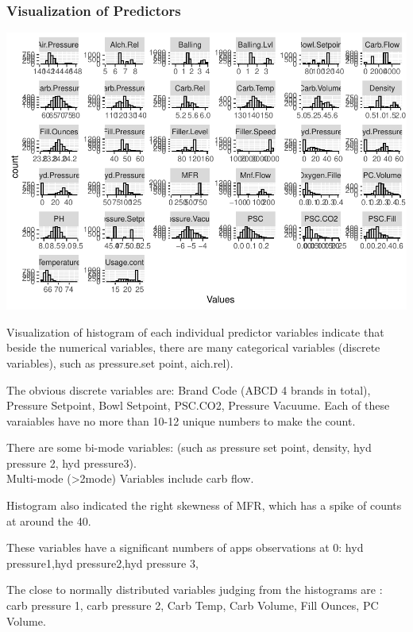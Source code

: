 \documentclass[]{article}
\begin{document}
\subsubsection{Visualization of
Predictors}\label{visualization-of-predictors}

\begin{center}\includegraphics{OmerOzeren_GracieHan_Project_2_files/figure-latex/unnamed-chunk-7-1} \end{center}

Visualization of histogram of each individual predictor variables
indicate that beside the numerical variables, there are many categorical
variables (discrete variables), such as pressure.set point, aich.rel).

The obvious discrete variables are: Brand Code (ABCD 4 brands in total),
Pressure Setpoint, Bowl Setpoint, PSC.CO2, Pressure Vacuume. Each of
these varaiables have no more than 10-12 unique numbers to make the
count.

There are some bi-mode variables: (such as pressure set point, density,
hyd pressure 2, hyd pressure3).\\
Multi-mode (\textgreater{}2mode) Variables include carb flow.

Histogram also indicated the right skewness of MFR, which has a spike of
counts at around the 40.

These variables have a significant numbers of apps observations at 0:
hyd pressure1,hyd pressure2,hyd pressure 3,

The close to normally distributed variables judging from the histograms
are : carb pressure 1, carb pressure 2, Carb Temp, Carb Volume, Fill
Ounces, PC Volume.
\end{document}
